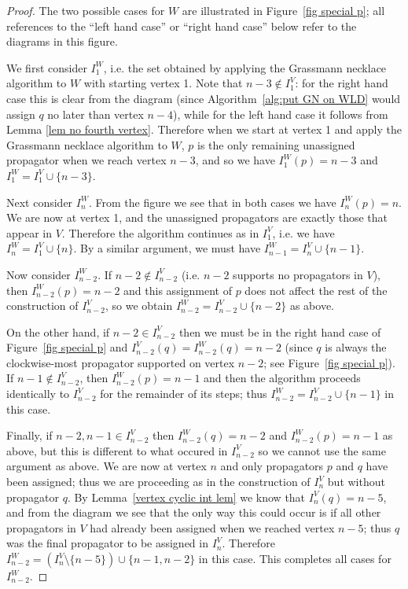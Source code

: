 \documentclass[11pt]{article}
\theoremstyle{remark}
\theoremstyle{definition}
\begin{document}
\begin{proof}

The two possible cases for $W$ are illustrated in Figure~\ref{fig special p}; all references to the ``left hand case'' or ``right hand case'' below refer to the diagrams in this figure.

We first consider $I_1^{W}$, i.e. the set obtained by applying the Grassmann necklace algorithm to $W$ with starting vertex 1. Note that $n-3 \not\in I_1^{V}$: for the right hand case this is clear from the diagram (since Algorithm~\ref{alg:put GN on WLD} would assign $q$ no later than vertex $n-4$), while for the left hand case it follows from Lemma \ref{lem no fourth vertex}. Therefore when we start at vertex 1 and apply the Grassmann necklace algorithm to $W$, $p$ is the only remaining unassigned propagator when we reach vertex $n-3$, and so we have $ I_1^{W}(p) = n-3$ and $I_1^W = I_1^V\cup \{n-3\}$.


Next consider $I_n^{W}$. From the figure we see that in both cases we have $I_n^{W}(p) = n$. We are now at vertex 1, and the unassigned propagators are exactly those that appear in $V$. Therefore the algorithm continues as in $I_1^{V}$, i.e. we have $I_n^{W} = I_1^{V} \cup \{n\}$. By a similar argument, we must have $I_{n-1}^{W} = I_n^{V} \cup \{n-1\}$.

Now consider $I_{n-2}^{W}$. If $n-2\not\in I_{n-2}^{V}$ (i.e. $n-2$ supports no propagators in $V$), then $I_{n-2}^W(p) = n-2$ and this assignment of $p$ does not affect the rest of the construction of $I_{n-2}^{V}$, so we obtain $I_{n-2}^{W} = I_{n-2}^{V}\cup \{n-2\}$ as above.

On the other hand, if $n-2\in I_{n-2}^{V}$ then we must be in the right hand case of Figure~\ref{fig special p} and $I_{n-2}^V(q) = I_{n-2}^W(q) = n-2$ (since $q$ is always the clockwise-most propagator supported on vertex $n-2$; see Figure~\ref{fig special p}). If $n-1 \not\in I_{n-2}^{V}$, then $I_{n-2}^W(p) = n-1$ and then the algorithm proceeds identically to $I_{n-2}^{V}$ for the remainder of its steps; thus $I_{n-2}^{W} = I_{n-2}^{V}\cup \{n-1\}$ in this case.

Finally, if $n-2,n-1 \in I_{n-2}^{V}$ then $I_{n-2}^W(q) = n-2$ and $I_{n-2}^W(p) = n-1$ as above, but this is different to what occured in $I_{n-2}^{V}$ so we cannot use the same argument as above. We are now at vertex $n$ and only propagators $p$ and $q$ have been assigned; thus we are proceeding as in the construction of $I_n^{V}$ but without propagator $q$. By Lemma~\ref{vertex cyclic int lem} we know that $I_n^V(q) = n-5$, and from the diagram we see that the only way this could occur is if all other propagators in $V$ had already been assigned when we reached vertex $n-5$; thus $q$ was the final propagator to be assigned in $I_n^{V}$. Therefore $I_{n-2}^{W} = (I_{n}^{V} \setminus \{n-5\}) \cup \{n-1, n-2\}$ in this case. This completes all cases for $I_{n-2}^{W}$.


\end{proof}
\end{document}
